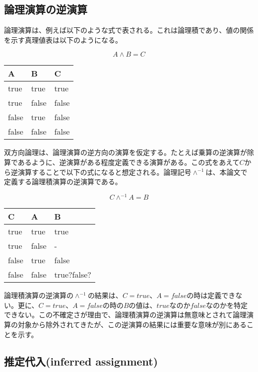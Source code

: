 \documentclass[12pt]{article}
\begin{document}
\subsection{論理演算の逆演算}\label{ux8ad6ux7406ux6f14ux7b97ux306eux9006ux6f14ux7b97}

論理演算は、例えば以下のような式で表される。これは論理積であり、値の関係を示す真理値表は以下のようになる。

\begin{equation} A \wedge B = C \end{equation}

\begin{longtable}[]{@{}lll@{}}
\toprule\noalign{}
A & B & C \\
\midrule\noalign{}
\endhead
\bottomrule\noalign{}
\endlastfoot
true & true & true \\
true & false & false \\
false & true & false \\
false & false & false \\
\end{longtable}

双方向論理は、論理演算の逆方向の演算を仮定する。たとえば乗算の逆演算が除算であるように、逆演算がある程度定義できる演算がある。この式をあえて\(C\)から逆演算することで以下の式になると想定される。論理記号\(\wedge^{-1}\)は、本論文で定義する論理積演算の逆演算である。

\begin{equation}  C \wedge^{-1} A = B \end{equation}

\begin{longtable}[]{@{}lll@{}}
\toprule\noalign{}
C & A & B \\
\midrule\noalign{}
\endhead
\bottomrule\noalign{}
\endlastfoot
true & true & true \\
true & false & - \\
false & true & false \\
false & false & true?false? \\
\end{longtable}

論理積演算の逆演算の\(\wedge^{-1}\)の結果は、\(C=true\)、\(A=false\)の時は定義できない。更に、\(C=true\)、\(A=false\)の時の\(B\)の値は、\(true\)なのか\(false\)なのかを特定できない。この不確定さが理由で、論理積演算の逆演算は無意味とされて論理演算の対象から除外されてきたが、この逆演算の結果には重要な意味が別にあることを示す。

\subsection{推定代入(inferred
assignment)}\label{ux63a8ux5b9aux4ee3ux5165inferred-assignment}
\end{document}

